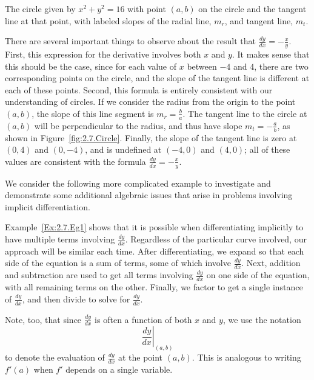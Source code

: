 \begin{marginfigure} %
\caption{The circle given by $x^2 + y^2 = 16$ with point $(a,b)$ on the circle and the tangent line at that point, with labeled slopes of the radial line, $m_r$, and tangent line, $m_t$.} \label{fig:2.7.Circle}
\end{marginfigure}

There are several important things to observe about the result that $\frac{dy}{dx} = -\frac{x}{y}$.  First, this expression for the derivative involves both $x$ and $y$.  It makes sense that this should be the case, since for each value of $x$ between $-4$ and $4$, there are two corresponding points on the circle, and the slope of the tangent line is different at each of these points.  Second, this formula is entirely consistent with our understanding of circles.  If we consider the radius from the origin to the point $(a,b)$, the slope of this line segment is $m_r = \frac{b}{a}$.  The tangent line to the circle at $(a,b)$ will be perpendicular to the radius, and thus have slope $m_t = -\frac{a}{b}$, as shown in Figure~\ref{fig:2.7.Circle}.  Finally, the slope of the tangent line is zero at $(0,4)$ and $(0,-4)$, and is undefined at $(-4,0)$ and $(4,0)$; all of these values are consistent with the formula $\frac{dy}{dx} = -\frac{x}{y}$.

We consider the following more complicated example to investigate and demonstrate some additional algebraic issues that arise in problems involving implicit differentiation.

\newpage


Example~\ref{Ex:2.7.Eg1} shows that it is possible when differentiating implicitly to have multiple terms involving $\frac{dy}{dx}$.  Regardless of the particular curve involved, our approach will be similar each time.  After differentiating, we expand so that each side of the equation is a sum of terms, some of which involve $\frac{dy}{dx}$.  Next, addition and subtraction are used to get all terms involving $\frac{dy}{dx}$ on one side of the equation, with all remaining terms on the other.   Finally, we factor to get a single instance of $\frac{dy}{dx}$, and then divide to solve for $\frac{dy}{dx}$.

Note, too, that since $\frac{dy}{dx}$ is often a function of both $x$ and $y$, we use the notation 
$$ \left. \frac{dy}{dx} \right|_{(a,b)}$$
to denote the evaluation of $\frac{dy}{dx}$ at the point $(a,b)$.  This is analogous to writing $f'(a)$ when $f'$ depends on a single variable.

